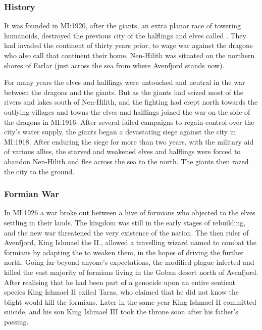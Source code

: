 \subsubsection{History}

It was founded in MI:1920, after the giants, an extra planar race of towering
humanoids, destroyed the previous city of the halflings and elves called
. They had invaded the continent of
 thirty years prior, to wage war against the dragons who
also call that continent their home. Nen-Hilith was situated on the northern
shores of Farlar (just across the sea from where Avenfjord stands now).

For many years the elves and halflings were untouched and neutral in the war
between the dragons and the giants. But as the giants had seized most of the
rivers and lakes south of Nen-Hilith, and the fighting had crept north towards
the outlying villages and towns the elves and halflings joined the war on the
side of the dragons in MI:1916. After several failed campaigns to regain
control over the city's water supply, the giants began a devastating siege
against the city in MI:1918. After enduring the siege for more than two years,
with the military aid of various allies, the starved and weakened elves and
halflings were forced to abandon Nen-Hilith and flee across the sea to the
north. The giants then razed the city to the ground.

\subsubsection{Formian War}
\label{sec:Formian War}

In MI:1926 a war broke out between a hive of formians who objected to the
elves settling in their lands. The kingdom was still in the early stages of
rebuilding, and the new war threatened the very existence of the nation. The
then ruler of Avenfjord, King Ishmael the II., allowed a travelling wizard
named  to combat the formians by adapting the
 to weaken them, in the hopes of driving the further
north. Going far beyond anyone's expectations, the modified plague infected
and killed the vast majority of formians living in the Goban desert north of
Avenfjord. After realising that he had been part of a genocide upon an entire
sentient species King Ishmael II exiled Taras, who claimed that he did not
know the blight would kill the formians. Later in the same year King Ishmael
II committed suicide, and his son King Ishmael III took the throne soon after
his father's passing.

